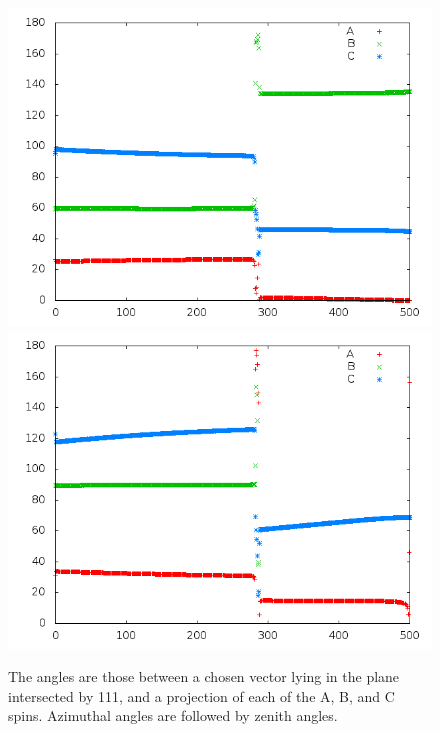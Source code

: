 \documentclass{article}
\begin{document}
\begin{figure}
\centering
\includegraphics[scale=0.5]{azim005to000R.png}
\includegraphics[scale=0.5]{zen005to000R.png}
\caption{The angles are those between a chosen vector lying in the plane intersected by 111,
and a projection of each of the A, B, and C spins. Azimuthal angles are followed by zenith angles.}
\end{figure}
\pagebreak
\end{document}
